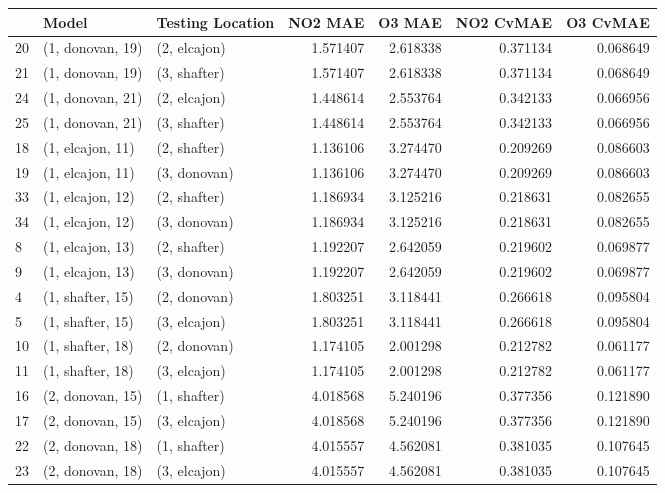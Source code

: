 \begin{tabular}{lllrrrr}
\toprule
{} &             Model & Testing Location &   NO2 MAE &    O3 MAE &  NO2 CvMAE &  O3 CvMAE \\
\midrule
20 &  (1, donovan, 19) &     (2, elcajon) &  1.571407 &  2.618338 &   0.371134 &  0.068649 \\
21 &  (1, donovan, 19) &     (3, shafter) &  1.571407 &  2.618338 &   0.371134 &  0.068649 \\
24 &  (1, donovan, 21) &     (2, elcajon) &  1.448614 &  2.553764 &   0.342133 &  0.066956 \\
25 &  (1, donovan, 21) &     (3, shafter) &  1.448614 &  2.553764 &   0.342133 &  0.066956 \\
18 &  (1, elcajon, 11) &     (2, shafter) &  1.136106 &  3.274470 &   0.209269 &  0.086603 \\
19 &  (1, elcajon, 11) &     (3, donovan) &  1.136106 &  3.274470 &   0.209269 &  0.086603 \\
33 &  (1, elcajon, 12) &     (2, shafter) &  1.186934 &  3.125216 &   0.218631 &  0.082655 \\
34 &  (1, elcajon, 12) &     (3, donovan) &  1.186934 &  3.125216 &   0.218631 &  0.082655 \\
8  &  (1, elcajon, 13) &     (2, shafter) &  1.192207 &  2.642059 &   0.219602 &  0.069877 \\
9  &  (1, elcajon, 13) &     (3, donovan) &  1.192207 &  2.642059 &   0.219602 &  0.069877 \\
4  &  (1, shafter, 15) &     (2, donovan) &  1.803251 &  3.118441 &   0.266618 &  0.095804 \\
5  &  (1, shafter, 15) &     (3, elcajon) &  1.803251 &  3.118441 &   0.266618 &  0.095804 \\
10 &  (1, shafter, 18) &     (2, donovan) &  1.174105 &  2.001298 &   0.212782 &  0.061177 \\
11 &  (1, shafter, 18) &     (3, elcajon) &  1.174105 &  2.001298 &   0.212782 &  0.061177 \\
16 &  (2, donovan, 15) &     (1, shafter) &  4.018568 &  5.240196 &   0.377356 &  0.121890 \\
17 &  (2, donovan, 15) &     (3, elcajon) &  4.018568 &  5.240196 &   0.377356 &  0.121890 \\
22 &  (2, donovan, 18) &     (1, shafter) &  4.015557 &  4.562081 &   0.381035 &  0.107645 \\
23 &  (2, donovan, 18) &     (3, elcajon) &  4.015557 &  4.562081 &   0.381035 &  0.107645 \\

\end{tabular}
